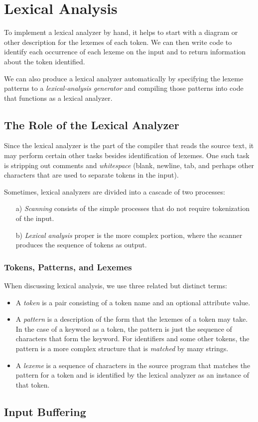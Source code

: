 \documentclass[a4paper,twoside]{book}
\begin{document}
\chapter{Lexical Analysis}

To implement a lexical analyzer by hand, it helps to start with a diagram or other description for the lexemes of each token. We can then write code to identify each occurrence of each lexeme on the input and to return information about the token identified.

We can also produce a lexical analyzer automatically by specifying the lexeme patterns to a \textit{lexical-analysis generator} and compiling those patterns into code that functions as a lexical analyzer.

\section{The Role of the Lexical Analyzer}

Since the lexical analyzer is the part of the compiler that reads the source text, it may perform certain other tasks besides identification of lexemes. One such task is stripping out comments and \textit{whitespace} (blank, newline, tab, and perhaps other characters that are used to separate tokens in the input).

Sometimes, lexical analyzers are divided into a cascade of two processes:
\begin{itemize}
    \item[a)]\textit{Scanning} consists of the simple processes that do not require tokenization of the input.
    \item[b)]\textit{Lexical analysis} proper is the more complex portion, where the scanner produces the sequence of tokens as output.
\end{itemize}

\subsection{Tokens, Patterns, and Lexemes}

When discussing lexical analysis, we use three related but distinct terms:
\begin{itemize}
    \item A \textit{token} is a pair consisting of a token name and an optional attribute value.
    \item A \textit{pattern} is a description of the form that the lexemes of a token may take. In the case of a keyword as a token, the pattern is just the sequence of characters that form the keyword. For identifiers and some other tokens, the pattern is a more complex structure that is \textit{matched} by many strings.
    \item A \textit{lexeme}  is a sequence of characters in the source program that matches the pattern for a token and is identified by the lexical analyzer as an instance of that token.
\end{itemize}

\section{Input Buffering}

\end{document}
